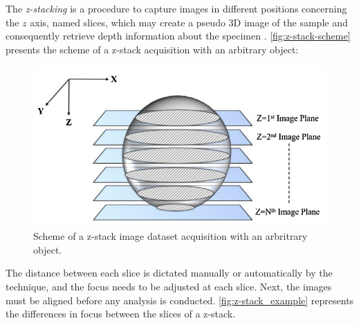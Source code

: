The \textit{z-stacking} is a procedure to capture images in different positions concerning the $z$ axis, named slices, which may create a pseudo 3D image of the sample and consequently retrieve depth information about the specimen \cite{lawlor2019introduction}. \autoref{fig:z-stack-scheme} presents the scheme of a z-stack acquisition with an arbitrary object:

\begin{figure}[htb]
	\centering
	\caption{\label{fig:z-stack-scheme} Scheme of a z-stack image dataset acquisition with an arbritrary object.}
	\begin{center}
	    \includegraphics[scale=0.4]{images/z-stack-object.png}
	\end{center}
	\centering
\end{figure}

The distance between each slice is dictated manually or automatically by the technique, and the focus needs to be adjusted at each slice. Next, the images must be aligned before any analysis is conducted. \autoref{fig:z-stack_example} represents the differences in focus between the slices of a z-stack.

